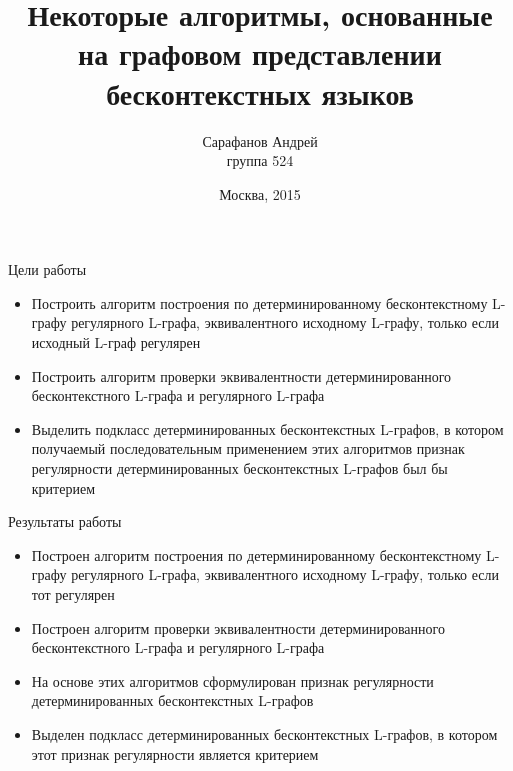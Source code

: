 \documentclass{beamer}
\title {Некоторые алгоритмы, основанные на графовом представлении бесконтекстных языков}
\author {Сарафанов Андрей \\ \small{группа 524}}
\institute {\small{
  Научный руководитель:\\
  к.ф.-м.н. Вылиток Алексей Александрович\\
}}
\date {\footnotesize{Москва, 2015}}
\begin{document}
\begin{frame}
  \titlepage
\end{frame}

\begin{frame} {Цели работы}
\begin{itemize}
  \item Построить алгоритм построения по детерминированному бесконтекстному L-графу регулярного L-графа, эквивалентного исходному L-графу, только если исходный L-граф регулярен
  \item Построить алгоритм проверки эквивалентности детерминированного бесконтекстного L-графа и регулярного L-графа
  \item Выделить подкласс детерминированных бесконтекстных L-графов, в котором получаемый последовательным применением этих алгоритмов признак регулярности детерминированных бесконтекстных L-графов был бы критерием
\end{itemize}
\end{frame}

\begin{frame} {Результаты работы}
\begin{itemize}
  \item Построен алгоритм построения по детерминированному бесконтекстному L-графу регулярного L-графа, эквивалентного исходному  L-графу, только если тот регулярен
  \item Построен алгоритм проверки эквивалентности детерминированного бесконтекстного L-графа и регулярного L-графа
  \item На основе этих алгоритмов сформулирован признак регулярности детерминированных бесконтекстных L-графов
  \item Выделен подкласс детерминированных бесконтекстных L-графов, в котором этот признак регулярности является критерием
\end{itemize}
\end{frame}
\end{document}
